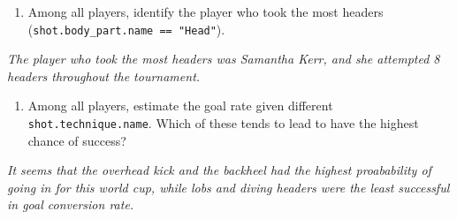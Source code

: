 \documentclass[]{article}
\newenvironment{Shaded}{\begin{snugshade}}{\end{snugshade}}
\newcommand{\DataTypeTok}[1]{\textcolor[rgb]{0.13,0.29,0.53}{#1}}
\newcommand{\KeywordTok}[1]{\textcolor[rgb]{0.13,0.29,0.53}{\textbf{#1}}}
\newcommand{\NormalTok}[1]{#1}
\newcommand{\OperatorTok}[1]{\textcolor[rgb]{0.81,0.36,0.00}{\textbf{#1}}}
\newcommand{\StringTok}[1]{\textcolor[rgb]{0.31,0.60,0.02}{#1}}
\providecommand{\tightlist}{%
  \setlength{\itemsep}{0pt}\setlength{\parskip}{0pt}}
\begin{document}
\begin{enumerate}
\def\labelenumi{\arabic{enumi}.}
\setcounter{enumi}{10}
\tightlist
\item
  Among all players, identify the player who took the most headers
  (\texttt{shot.body\_part.name\ ==\ "Head"}).
\end{enumerate}

\begin{Shaded}
\end{Shaded}

\emph{The player who took the most headers was Samantha Kerr, and she
attempted 8 headers throughout the tournament.}

\begin{enumerate}
\def\labelenumi{\arabic{enumi}.}
\setcounter{enumi}{11}
\tightlist
\item
  Among all players, estimate the goal rate given different
  \texttt{shot.technique.name}. Which of these tends to lead to have the
  highest chance of success?
\end{enumerate}

\begin{Shaded}
\end{Shaded}

\emph{It seems that the overhead kick and the backheel had the highest
proabability of going in for this world cup, while lobs and diving
headers were the least successful in goal conversion rate.}
\end{document}
